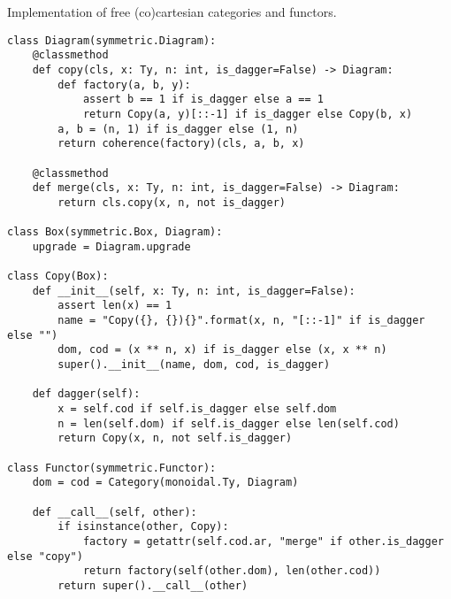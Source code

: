 \begin{python}
{\normalfont Implementation of free (co)cartesian categories and functors.}

\begin{verbatim}
class Diagram(symmetric.Diagram):
    @classmethod
    def copy(cls, x: Ty, n: int, is_dagger=False) -> Diagram:
        def factory(a, b, y):
            assert b == 1 if is_dagger else a == 1
            return Copy(a, y)[::-1] if is_dagger else Copy(b, x)
        a, b = (n, 1) if is_dagger else (1, n)
        return coherence(factory)(cls, a, b, x)

    @classmethod
    def merge(cls, x: Ty, n: int, is_dagger=False) -> Diagram:
        return cls.copy(x, n, not is_dagger)

class Box(symmetric.Box, Diagram):
    upgrade = Diagram.upgrade

class Copy(Box):
    def __init__(self, x: Ty, n: int, is_dagger=False):
        assert len(x) == 1
        name = "Copy({}, {}){}".format(x, n, "[::-1]" if is_dagger else "")
        dom, cod = (x ** n, x) if is_dagger else (x, x ** n)
        super().__init__(name, dom, cod, is_dagger)

    def dagger(self):
        x = self.cod if self.is_dagger else self.dom
        n = len(self.dom) if self.is_dagger else len(self.cod)
        return Copy(x, n, not self.is_dagger)

class Functor(symmetric.Functor):
    dom = cod = Category(monoidal.Ty, Diagram)

    def __call__(self, other):
        if isinstance(other, Copy):
            factory = getattr(self.cod.ar, "merge" if other.is_dagger else "copy")
            return factory(self(other.dom), len(other.cod))
        return super().__call__(other)
\end{verbatim}
\end{python}

